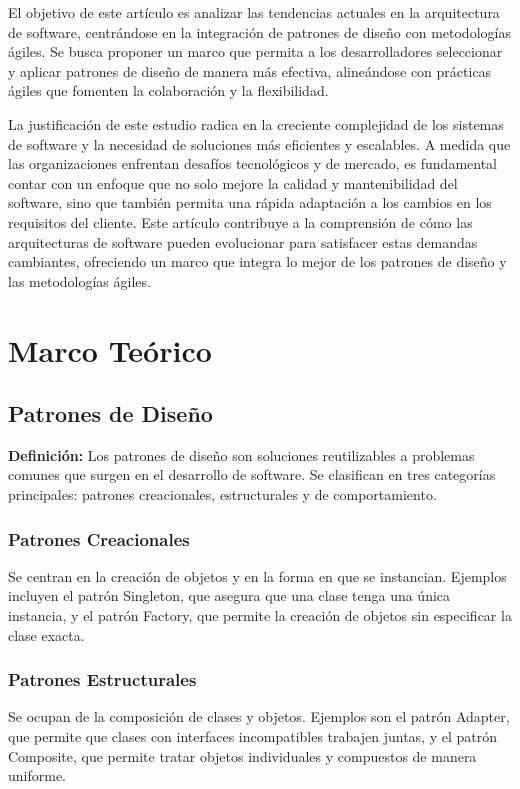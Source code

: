 \documentclass[twocolumn]{article}
\begin{document}
El objetivo de este artículo es analizar las tendencias actuales en la arquitectura de software, centrándose en la integración de patrones de diseño con metodologías ágiles. Se busca proponer un marco que permita a los desarrolladores seleccionar y aplicar patrones de diseño de manera más efectiva, alineándose con prácticas ágiles que fomenten la colaboración y la flexibilidad.

La justificación de este estudio radica en la creciente complejidad de los sistemas de software y la necesidad de soluciones más eficientes y escalables. A medida que las organizaciones enfrentan desafíos tecnológicos y de mercado, es fundamental contar con un enfoque que no solo mejore la calidad y mantenibilidad del software, sino que también permita una rápida adaptación a los cambios en los requisitos del cliente. Este artículo contribuye a la comprensión de cómo las arquitecturas de software pueden evolucionar para satisfacer estas demandas cambiantes, ofreciendo un marco que integra lo mejor de los patrones de diseño y las metodologías ágiles.

\section{Marco Teórico}

\subsection{Patrones de Diseño}
\textbf{Definición:} Los patrones de diseño son soluciones reutilizables a problemas comunes que surgen en el desarrollo de software. Se clasifican en tres categorías principales: patrones creacionales, estructurales y de comportamiento.

\subsubsection{Patrones Creacionales}
Se centran en la creación de objetos y en la forma en que se instancian. Ejemplos incluyen el patrón Singleton, que asegura que una clase tenga una única instancia, y el patrón Factory, que permite la creación de objetos sin especificar la clase exacta.

\subsubsection{Patrones Estructurales}
Se ocupan de la composición de clases y objetos. Ejemplos son el patrón Adapter, que permite que clases con interfaces incompatibles trabajen juntas, y el patrón Composite, que permite tratar objetos individuales y compuestos de manera uniforme.
\end{document}
